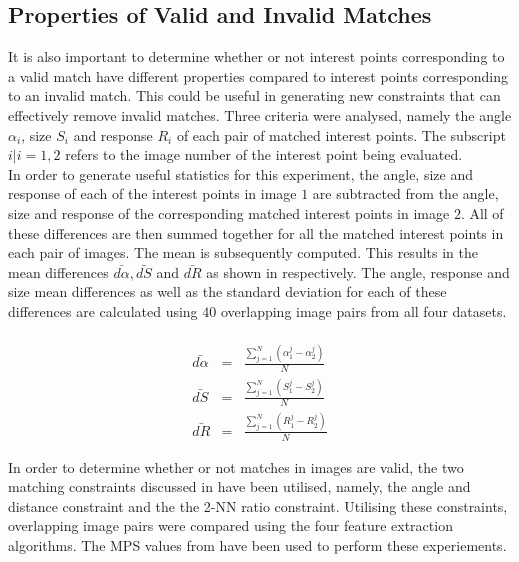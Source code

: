 \documentclass{report}
\begin{document}
\subsection{Properties of Valid and Invalid Matches}
\label{sec:keypointMatching}
It is also important to determine whether or not interest points corresponding to a valid match have different properties compared to interest points corresponding to an invalid match. This could be useful in generating new constraints that can effectively remove invalid matches. Three criteria were analysed, namely the angle $\alpha_i$, size $S_i$ and response $R_i$ of each pair of matched interest points. The subscript $i|i={1,2}$ refers to the image number of the interest point being evaluated.\\

In order to generate useful statistics for this experiment, the angle, size and response of each of the interest points in image $1$ are subtracted from the angle, size and response of the corresponding matched interest points in image $2$. All of these differences are then summed together for all the matched interest points in each pair of images. The mean is subsequently computed. This results in the mean differences $\bar{d\alpha}, \bar{dS}$ and $\bar{dR}$ as shown in  respectively. The angle, response and size mean differences as well as the standard deviation for each of these differences are calculated using $40$ overlapping image pairs from all four datasets.\\ \\

\begin{eqnarray}
\bar{d\alpha} &=& \frac{\sum_{j=1}^N (\alpha_1^j - \alpha_2^j)}{N}\\
\bar{dS} &=& \frac{\sum_{j=1}^N (S_1^j - S_2^j)}{N}\\
\bar{dR} &=& \frac{\sum_{j=1}^N (R_1^j - R_2^j)}{N}
\label{eqn:differenceProperties}
\end{eqnarray}

In order to determine whether or not matches in images are valid, the two matching constraints discussed in  have been utilised, namely, the angle and distance constraint and the the 2-NN ratio constraint. Utilising these constraints, overlapping image pairs were compared using the four feature extraction algorithms. The MPS values from  have been used to perform these experiements. \\
\end{document}
